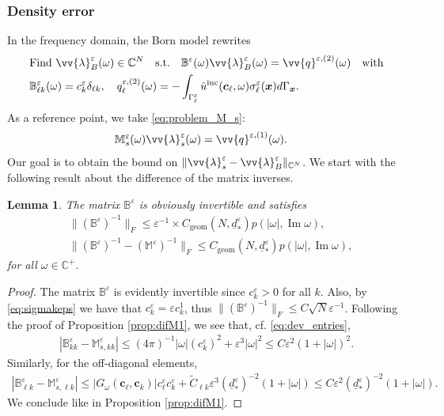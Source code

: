 \documentclass[]{article}
\newtheorem{lemma}{Lemma}
\numberwithin{equation}{section}
\numberwithin{theorem}{section}
\numberwithin{lemma}{section}
\numberwithin{corollary}{section}
\numberwithin{proposition}{section}
\numberwithin{definition}{section}
\newcommand{\bx}{\boldsymbol{x}}
\newcommand{\bc}{\boldsymbol{c}}
\newcommand{\re}{\varepsilon}
\renewcommand{\vec}{\boldsymbol}
\renewcommand{\Im}{\operatorname{Im}}
\begin{document}
\begin{appendices}
		\subsubsection*{Density error}
		In the frequency domain,  the Born model rewrites
		\begin{align}
			\label{eq:born_problem}
			\begin{split}
				&\text{Find}~\vv{{\lambda}}^{\re}_B(\omega) \in \mathbb{C}^N \quad \text{s.t.} \quad \mathbb{B}^{\re}(\omega) \vv{\lambda}^{\re}_B(\omega) = \vv{q}^{\re, (2)}(\omega) \quad \text{with} \\
				&\mathbb{B}^{\re}_{\ell k}(\omega) = c^{\re}_k \delta_{\ell k}, \quad q^{\re, (2)}_{\ell}(\omega) = -\int_{\Gamma^{\varepsilon}_{\ell} }\hat{u}^{\operatorname{inc}}(\vec{c}_{\ell} , \omega){\sigma}_{\ell} ^{\varepsilon}(\bx)d\Gamma_{\bx}.
			\end{split}
		\end{align}
		As a reference point, we take \eqref{eq:problem_M_s}:
		\begin{align*}%
			&\mathbb{M}^{\re}_s(\omega) \vv{\lambda}^{\re}_s(\omega) = \vv{q}^{\re, (1)}(\omega).	
		\end{align*}
		Our goal is to obtain the bound on $\| \vv{\lambda}^{\re}_s-\vv{\lambda}^{\re}_B \|_{\mathbb{C}^N}$. 
		We start with the following result about the difference of the matrix inverses. 
		\begin{lemma}
			The matrix $\mathbb{B}^{\re}$
			is obviously invertible and satisfies
			\begin{align*}%
				&\| (\mathbb{B}^{\re})^{-1} \|_F \leq \re^{-1} \times C_{\operatorname{geom}}(N, \underline{d}_*^{\re})p(|\omega|, \Im \omega), \\
				&\|(\mathbb{B}^{\re})^{-1}-(\mathbb{M}^{\re})^{-1}\|_F \leq C_{\operatorname{geom}}(N, \underline{d}_*^{\re})p(|\omega|, \Im \omega),
			\end{align*}
			for all $\omega \in \mathbb{C}^{+}$.
		\end{lemma}
		\begin{proof}
			The matrix $\mathbb{B}^{\re}$ is evidently invertible since $c_k^{\re}>0$ for all $k$. Also, by \eqref{eq:sigmakeps} we have that $c_k^{\re}=\re c_k^1$, thus $\|(\mathbb{B}^{\re})^{-1}\|_F\leq C\sqrt{N}\re^{-1}$. Following the proof of Proposition \ref{prop:difM1}, we see that, cf. \eqref{eq:dev_entries}, 
			\begin{align*}%
				|\mathbb{B}_{kk}^{\re}-\mathbb{M}_{s,kk}^{\re}|\leq (4\pi)^{-1}|\omega|(c_k^{\re})^2+\varepsilon^3|\omega|^2\leq C\varepsilon^2(1+|\omega|)^2.
			\end{align*}
			Similarly, for the off-diagonal elements, 
			\begin{align*}%
				|\mathbb{B}_{\ell k}^{\re}-\mathbb{M}_{s,\ell k}^{\re}|\leq |G_{\omega}(\vec{c}_{\ell}, \bc_k)|c_{\ell}^{\re}c_k^{\re}+\widetilde{C}_{\ell k}\re^3 (\underline{d}_*^{\re})^{-2}(1+|\omega|)\leq C\re^2 (\underline{d}_*^{\re})^{-2}(1+|\omega|).
			\end{align*}
			We conclude like in Proposition \ref{prop:difM1}.  
		\end{proof}
				

\end{appendices}
\end{document}
